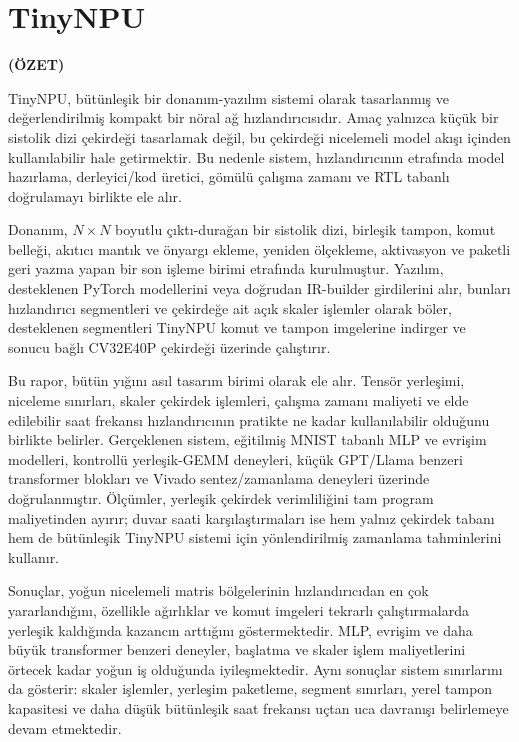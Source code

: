 \documentclass[a4paper, 12pt, titlepage]{article}
\newcommand{\theturkishtitle}{TinyNPU}
\begin{document}
\newpage
\section*{\centering\theturkishtitle}
\centerline{\fontsize{16pt}{21.6pt}\sffamily\bfseries (ÖZET)}
TinyNPU, bütünleşik bir donanım-yazılım sistemi olarak tasarlanmış ve değerlendirilmiş kompakt bir nöral ağ hızlandırıcısıdır. Amaç yalnızca küçük bir sistolik dizi çekirdeği tasarlamak değil, bu çekirdeği nicelemeli model akışı içinden kullanılabilir hale getirmektir. Bu nedenle sistem, hızlandırıcının etrafında model hazırlama, derleyici/kod üretici, gömülü çalışma zamanı ve RTL tabanlı doğrulamayı birlikte ele alır.

Donanım, \(N \times N\) boyutlu çıktı-durağan bir sistolik dizi, birleşik tampon, komut belleği, akıtıcı mantık ve önyargı ekleme, yeniden ölçekleme, aktivasyon ve paketli geri yazma yapan bir son işleme birimi etrafında kurulmuştur. Yazılım, desteklenen PyTorch modellerini veya doğrudan IR-builder girdilerini alır, bunları hızlandırıcı segmentleri ve çekirdeğe ait açık skaler işlemler olarak böler, desteklenen segmentleri TinyNPU komut ve tampon imgelerine indirger ve sonucu bağlı CV32E40P çekirdeği üzerinde çalıştırır.

Bu rapor, bütün yığını asıl tasarım birimi olarak ele alır. Tensör yerleşimi, niceleme sınırları, skaler çekirdek işlemleri, çalışma zamanı maliyeti ve elde edilebilir saat frekansı hızlandırıcının pratikte ne kadar kullanılabilir olduğunu birlikte belirler. Gerçeklenen sistem, eğitilmiş MNIST tabanlı MLP ve evrişim modelleri, kontrollü yerleşik-GEMM deneyleri, küçük GPT/Llama benzeri transformer blokları ve Vivado sentez/zamanlama deneyleri üzerinde doğrulanmıştır. Ölçümler, yerleşik çekirdek verimliliğini tam program maliyetinden ayırır; duvar saati karşılaştırmaları ise hem yalnız çekirdek tabanı hem de bütünleşik TinyNPU sistemi için yönlendirilmiş zamanlama tahminlerini kullanır.

Sonuçlar, yoğun nicelemeli matris bölgelerinin hızlandırıcıdan en çok yararlandığını, özellikle ağırlıklar ve komut imgeleri tekrarlı çalıştırmalarda yerleşik kaldığında kazancın arttığını göstermektedir. MLP, evrişim ve daha büyük transformer benzeri deneyler, başlatma ve skaler işlem maliyetlerini örtecek kadar yoğun iş olduğunda iyileşmektedir. Aynı sonuçlar sistem sınırlarını da gösterir: skaler işlemler, yerleşim paketleme, segment sınırları, yerel tampon kapasitesi ve daha düşük bütünleşik saat frekansı uçtan uca davranışı belirlemeye devam etmektedir.
\end{document}
